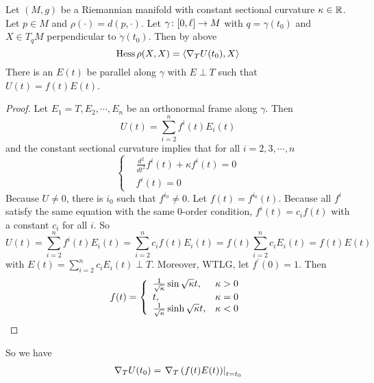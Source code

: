 \begin{enumerate}[label=\arabic{*}]
	\begin{exam}
		Let $(M,g)$ be a Riemannian manifold with constant sectional curvature $\kappa \in \mathbb{R}$. Let $p \in M$ and $\rho(\cdot) = d(p,\cdot)$. Let $\gamma \colon [0,\ell] \rightarrow M$ with $q = \gamma(t_0)$ and $X \in T_qM$ perpendicular to $\dot{\gamma}(t_0)$. Then by above
		\begin{equation*}
			\operatorname{Hess}\rho(X,X) = \left\langle \nabla_TU(t_0),X \right\rangle
		\end{equation*}
		There is an $E(t)$ be parallel along $\gamma$ with $E \perp T$ such that $U(t) = f(t)E(t)$.
		\begin{proof}
			Let $E_1=T,E_2,\cdots,E_n$ be an orthonormal frame along $\gamma$. Then
			\begin{equation*}
				U(t) = \sum_{i=2}^nf^i(t)E_i(t)
			\end{equation*}
			and the constant sectional curvature implies that for all $i = 2,3,\cdots,n$
			\begin{equation*}
				\left\{
					\begin{aligned}
						&\frac{d^2}{dt^2}f^i(t) + \kappa f^i(t) = 0 \\
						&f^i(t) = 0
					\end{aligned}
				\right.
			\end{equation*}
			Because $U \neq 0$, there is $i_0$ such that $f^{i_0} \neq 0$. Let $f(t) = f^{i_0}(t)$. Because all $f^i$ satisfy the same equation with the same $0$-order condition, $f^i(t) = c_if(t)$ with a constant $c_i$ for all $i$. So
			\begin{equation*}
				U(t) = \sum_{i=2}^nf^i(t)E_i(t) = \sum_{i=2}^nc_if(t)E_i(t) = f(t) \sum_{i=2}^nc_iE_i(t) = f(t) E(t)
			\end{equation*}
			with $E(t) = \sum_{i=2}^nc_iE_i(t) \perp T$.  Moreover, WTLG, let $f^\prime(0) = 1$. Then
		\begin{equation*}
			f(t) = \left\{
				\begin{array}{ll}
					\frac{1}{\sqrt{\kappa}} \sin \sqrt{\kappa}t,&\kappa > 0\\
					t,&\kappa = 0 \\
					\frac{1}{\sqrt{\kappa}} \sinh \sqrt{\kappa}t,&\kappa < 0
				\end{array}
			\right. \qedhere
		\end{equation*}
		\end{proof}
		So we have
		\begin{equation*}
			\begin{aligned}
				\nabla_TU(t_0) &= \lv{\nabla_T \bc{f(t)E(t)}}_{t=t_0}\\

\end{aligned}
\end{equation*}
\end{exam}
\end{enumerate}

